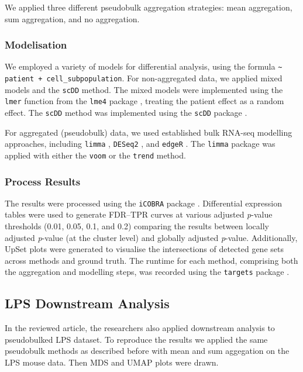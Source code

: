 \documentclass[a4paper, 11pt, twocolumn]{article}
\begin{document}
\begin{multicols}{2}
We applied three different pseudobulk aggregation strategies: mean aggregation, sum aggregation, and no aggregation.

\subsubsection{Modelisation}

We employed a variety of models for differential analysis, using the formula \texttt{\textasciitilde{} patient + cell\_subpopulation}. For non-aggregated data, we applied mixed models and the \texttt{scDD} method. The mixed models were implemented using the \texttt{lmer} function from the \texttt{lme4} package \citep{lme4}, treating the patient effect as a random effect. The \texttt{scDD} method was implemented using the \texttt{scDD} package \citep{scdd}.

For aggregated (pseudobulk) data, we used established bulk RNA-seq modelling approaches, including \texttt{limma} \citep{limma}, \texttt{DESeq2} \citep{deseq2}, and \texttt{edgeR} \citep{edger}. The \texttt{limma} package was applied with either the \texttt{voom} or the \texttt{trend} method.

\subsubsection{Process Results}

The results were processed using the \texttt{iCOBRA} package \citep{icobra}. Differential expression tables were used to generate FDR–TPR curves at various adjusted \textit{p}-value thresholds (0.01, 0.05, 0.1, and 0.2) comparing the results between locally adjusted \textit{p}-value (at the cluster level) and globally adjusted \textit{p}-value. Additionally, UpSet plots were generated to visualise the intersections of detected gene sets across methods and ground truth. The runtime for each method, comprising both the aggregation and modelling steps, was recorded using the \texttt{targets} package \citep{targets}.

\subsection{LPS Downstream Analysis}

In the reviewed article, the researchers also applied downstream analysis to pseudobulked LPS dataset. To reproduce the results we applied the same pseudobulk methods as described before with mean and sum aggegation on the LPS mouse data. Then MDS and UMAP plots were drawn.

\end{multicols}
\end{document}
